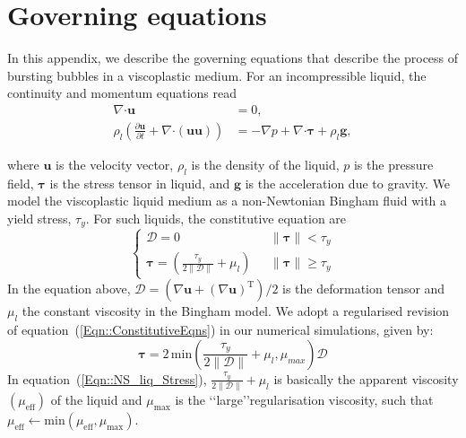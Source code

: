 \documentclass[final]{jfm}
\begin{document}
\appendix
\section{Governing equations}\label{App::GoverningEquations}
In this appendix, we describe the governing equations that describe the process of bursting bubbles in a viscoplastic medium. For an incompressible liquid, the continuity and momentum equations read  
\begin{align}\label{Eqn::NS_liq}
\nabla\boldsymbol{\cdot}\boldsymbol{u} &= 0,\\ 
\label{Eqn::NS_liq2}
\rho_l\left(\frac{\partial\boldsymbol{u}}{\partial t} + \nabla\boldsymbol{\cdot}\left(\boldsymbol{uu}\right)\right) &= -\nabla p + \nabla\boldsymbol{\cdot}\boldsymbol{\tau} + \rho_l\boldsymbol{g},
\end{align}

\noindent where $\boldsymbol{u}$ is the velocity vector, $\rho_l$ is the density of the liquid, $p$ is the pressure field, $\boldsymbol{\tau}$ is the stress tensor in liquid, and $\boldsymbol{g}$ is the acceleration due to gravity.
We model the viscoplastic liquid medium as a non-Newtonian Bingham fluid with a yield stress, $\tau_y$. For such liquids, the constitutive equation are
\begin{equation}\label{Eqn::ConstitutiveEqns}
\begin{cases}
\boldsymbol{\mathcal{D}}=0\,\,&\,\,\|\boldsymbol{\tau}\| < \tau_y\\
\boldsymbol{\tau} =\left( \frac{\tau_y}{2 \|\boldsymbol{\mathcal{D}} \|} + \mu_l \right)\,\,&\,\,\|\boldsymbol{\tau}\| \geq \tau_y
\end{cases}
\end{equation} 
In the equation above, $\boldsymbol{\mathcal{D}} = \left(\nabla\boldsymbol{u} + \left(\nabla\boldsymbol{u}\right)^{\text{T}}\right)/2$ is the deformation tensor and $\mu_l$ the constant viscosity in the Bingham model. 
We adopt a regularised revision of equation~(\ref{Eqn::ConstitutiveEqns}) in our numerical simulations, given by:
\begin{equation}\label{Eqn::NS_liq_Stress}
\boldsymbol{\tau} = 2\,\mathrm{min}\left(\frac{\tau_y}{2\|\boldsymbol{\mathcal{D}}\|} + \mu_l , \mu_{max}\right) \boldsymbol{\mathcal{D}}
\end{equation}
In equation~(\ref{Eqn::NS_liq_Stress}), $\frac{\tau_y}{2\|\boldsymbol{\mathcal{D}}\|} + \mu_l$ is basically the apparent viscosity $\left(\mu_{\text{eff}}\right)$ of the liquid and $\mu_{\text{max}}$ is the \lq\lq large\rq\rq regularisation viscosity, such that $\mu_{\text{eff}} \gets \text{min}\left(\mu_{\text{eff}}, \mu_{\text{max}}\right)$. 
\end{document}
